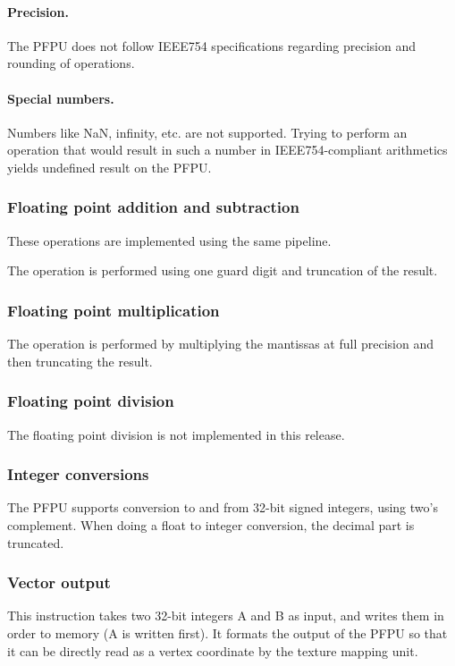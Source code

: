 \documentclass[a4paper,11pt]{article}
\begin{document}
\paragraph{Precision.} The PFPU does not follow IEEE754 specifications regarding precision and rounding of operations.

\paragraph{Special numbers.} Numbers like NaN, infinity, etc. are not supported. Trying to perform an operation that would result in such a number in IEEE754-compliant arithmetics yields undefined result on the PFPU.

\subsubsection{Floating point addition and subtraction}
These operations are implemented using the same pipeline.

The operation is performed using one guard digit and truncation of the result.

\subsubsection{Floating point multiplication}
The operation is performed by multiplying the mantissas at full precision and then truncating the result.

\subsubsection{Floating point division}
The floating point division is not implemented in this release.

\subsubsection{Integer conversions}
The PFPU supports conversion to and from 32-bit signed integers, using two's complement. When doing a float to integer conversion, the decimal part is truncated.

\subsubsection{Vector output}
This instruction takes two 32-bit integers A and B as input, and writes them in order to memory (A is written first). It formats the output of the PFPU so that it can be directly read as a vertex coordinate by the texture mapping unit.
\end{document}
